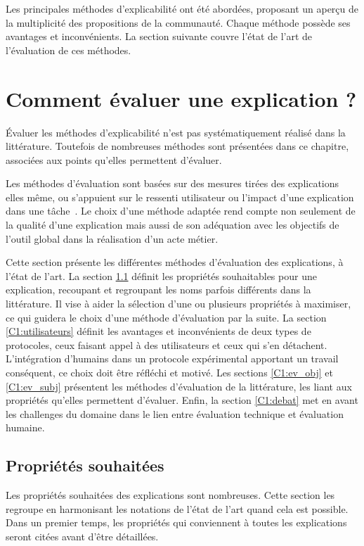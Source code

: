 Les principales méthodes d'explicabilité ont été abordées, proposant un aperçu de la multiplicité des propositions de la communauté. Chaque méthode possède ses avantages et inconvénients. La section suivante couvre l'état de l'art de l'évaluation de ces méthodes.


\section{Comment évaluer une explication ?} \label{C1:evaluations}

Évaluer les méthodes d'explicabilité n'est pas systématiquement réalisé dans la littérature. Toutefois de nombreuses méthodes sont présentées dans ce chapitre, associées aux points qu'elles permettent d'évaluer.

Les méthodes d'évaluation sont basées sur des mesures tirées des explications elles même, ou s'appuient sur le ressenti utilisateur ou l'impact d'une explication dans une tâche~\cite{Ayyar2021, Dodge2020}. Le choix d'une méthode adaptée rend compte non seulement de la qualité d'une explication mais aussi de son adéquation avec les objectifs de l'outil global dans la réalisation d'un acte métier.

Cette section présente les différentes méthodes d'évaluation des explications, à l'état de l'art.
La section \ref{C1:proprietes} définit les propriétés souhaitables pour une explication, recoupant et regroupant les noms parfois différents dans la littérature. Il vise à aider la sélection d'une ou plusieurs propriétés à maximiser, ce qui guidera le choix d'une méthode d'évaluation par la suite.
La section \ref{C1:utilisateurs} définit les avantages et inconvénients de deux types de protocoles, ceux faisant appel à des utilisateurs et ceux qui s'en détachent. L'intégration d'humains dans un protocole expérimental apportant un travail conséquent, ce choix doit être réfléchi et motivé.
Les sections \ref{C1:ev_obj} et \ref{C1:ev_subj} présentent les méthodes d'évaluation de la littérature, les liant aux propriétés qu'elles permettent d'évaluer.
Enfin, la section \ref{C1:debat} met en avant les challenges du domaine dans le lien entre évaluation technique et évaluation humaine.


\subsection{Propriétés souhaitées} \label{C1:proprietes}

Les propriétés souhaitées des explications sont nombreuses. Cette section les regroupe en harmonisant les notations de l'état de l'art quand cela est possible.
Dans un premier temps, les propriétés qui conviennent à toutes les explications seront citées avant d'être détaillées.

